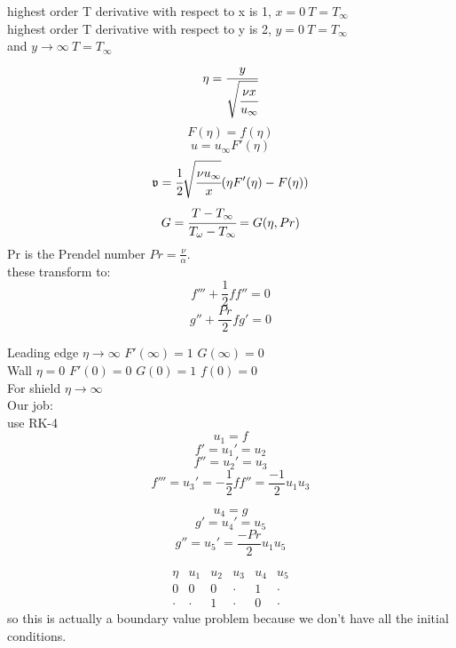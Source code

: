\documentclass{article}
\begin{document}
highest order T derivative with respect to x is 1, $x=0\ T=T_\infty$\\
highest order T derivative with respect to y is 2, $y=0\ T=T_\infty$\\
and $y\to\infty\ T=T_\infty$\\

\[\eta=\cfrac{y}{\sqrt{\cfrac{\nu x}{u_\infty}}}\]
\[F(\eta)=f(\eta)\]
\[u=u_\infty F'(\eta)\]
\[\mathfrak{v}=\cfrac{1}{2}\sqrt{\cfrac{\nu u_\infty}{x}}(\eta F'(\eta)-F(\eta))\]
\[G=\cfrac{T-T_\infty}{T_\omega-T_\infty}=G(\eta,Pr)\]
Pr is the Prendel number $Pr=\frac{\nu}{\alpha}$.\\

these transform to:\\
\[f'''+\frac{1}{2}ff''=0\]
\[g''+\frac{Pr}{2}fg'=0\]

Leading edge $\eta\to\infty$    $F'(\infty)=1$    $G(\infty)=0$\\
Wall $\eta=0$    $F'(0)=0$    $G(0)=1$   $f(0)=0$\\
For shield $\eta\to\infty$\\

Our job:\\
use RK-4\\

\[u_1=f\]
\[f'=u_1'=u_2\]
\[f''=u_2'=u_3\]
\[f'''=u_3'=-\frac{1}{2}ff''=\frac{-1}{2}u_1u_3\]

\[u_4=g\]
\[g'=u_4'=u_5\]
\[g''=u_5'=\frac{-Pr}{2}u_1u_5\]

\[\begin{array}{l|l|l|l|l|l}
    \eta &u_1&u_2&u_3&u_4&u_5\\\hline
    0 & 0 & 0 &\cdot & 1&\cdot \\\hline
    \cdot &\cdot &1 &\cdot &0 &\cdot
\end{array}\]
so this is actually a boundary value problem because we don't have all the initial conditions.\\
\end{document}
